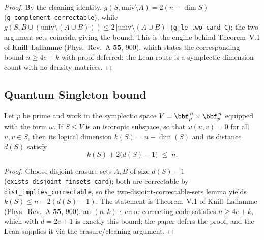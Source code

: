 \begin{proof}
\leanok
By the cleaning identity, $g(S, \mathrm{univ} \setminus A) = 2(n - \dim S)$
(\texttt{g\_complement\_correctable}), while
$g(S, B \cup (\mathrm{univ}\setminus(A \cup B))) \le
2\,|\mathrm{univ}\setminus(A \cup B)|$ (\texttt{g\_le\_two\_card\_C}); the two
argument sets coincide, giving the bound.  This is the engine behind
Theorem~V.1 of Knill--Laflamme (Phys.\ Rev.\ A \textbf{55}, 900), which
states the corresponding bound $n \ge 4e + k$ with proof deferred; the Lean
route is a symplectic dimension count with no density matrices.
\end{proof}

\subsection{Quantum Singleton bound}

\begin{theorem}
\label{quantum_singleton_bound}
\leanok
{}
Let $p$ be prime and work in the symplectic space $V = \bbf_p^{\,n} \times \bbf_p^{\,n}$
equipped with the form $\omega$. If $S \le V$ is an isotropic subspace, so that
$\omega(u,v) = 0$ for all $u, v \in S$, then its logical dimension $k(S) = n - \dim(S)$
and its distance $d(S)$ satisfy
\[
k(S) + 2\bigl(d(S) - 1\bigr) \;\le\; n .
\]
\end{theorem}

\begin{proof}
\leanok
Choose disjoint erasure sets $A, B$ of size $d(S)-1$
(\texttt{exists\_disjoint\_finsets\_card}); both are correctable by
\texttt{dist\_implies\_correctable}, so the two-disjoint-correctable-sets
lemma yields $k(S) \le n - 2(d(S)-1)$.  The statement is Theorem~V.1 of
Knill--Laflamme (Phys.\ Rev.\ A \textbf{55}, 900): an $(n,k)$
$e$-error-correcting code satisfies $n \ge 4e + k$, which with $d = 2e+1$ is
exactly this bound; the paper defers the proof, and the Lean supplies it via
the erasure/cleaning argument.
\end{proof}

